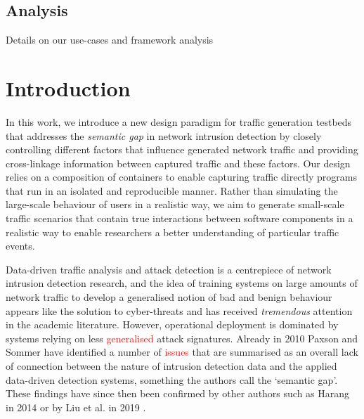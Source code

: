 \documentclass{article}
\begin{document}




\subsection*{Analysis}

Details on our use-cases and framework analysis

\pagebreak


\section{Introduction}



In this work, we introduce a new design paradigm for traffic generation testbeds that addresses the \textit{semantic gap} in network intrusion detection by closely controlling different factors that influence generated network traffic and providing cross-linkage information between captured traffic and these factors. Our design relies on a composition of containers to enable capturing traffic directly programs that run in an isolated and reproducible manner. Rather than simulating the large-scale behaviour of users in a realistic way, we aim to generate small-scale traffic scenarios that contain true interactions between software components in a realistic way to enable researchers a better understanding of particular traffic events. 

Data-driven traffic analysis and attack detection is a centrepiece of network intrusion detection research, and the idea of training systems on large amounts of network traffic to develop a generalised notion of bad and benign behaviour appears  like the solution to cyber-threats and has received \textit{tremendous} attention in the academic literature. However, operational deployment is dominated by systems relying on less \textcolor{red}{generalised} attack signatures. Already in 2010 Paxson and Sommer \cite{sommer2010outside} have identified a number of \textcolor{red}{issues} that are summarised as an overall lack of connection between the nature of intrusion detection data and the applied data-driven detection systems, something the authors call the `semantic gap'. These findings have since then been confirmed by other authors such as Harang \cite{harang2014bridging} in 2014 or by Liu et al. in 2019 \cite{liu2019machine}.
\end{document}
